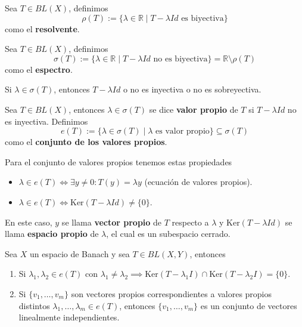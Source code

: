 \documentclass[12pt]{book}
\newcommand{\tbf}{\textbf}
\newcommand{\R}{\mathbb{R}}
\begin{document}
\begin{definicion}[Resolvente]
    Sea $T \in BL(X)$, definimos 
    $$\rho(T) := \{ \lambda \in \mathbb{R} \mid T - \lambda Id \text{ es biyectiva} \}$$
    como el \tbf{resolvente}.
\end{definicion}
\begin{definicion}[Espectro]
    Sea $T \in BL(X)$, definimos 
    $$\sigma(T) := \{ \lambda \in \mathbb{R} \mid T - \lambda Id \text{ no es biyectiva} \}=\R\setminus \rho(T)$$ 
    como el \tbf{espectro}. \\
\end{definicion}

\begin{observacion}
    Si $\lambda \in \sigma(T)$, entonces $T - \lambda Id$ o no es inyectiva o no es sobreyectiva.
\end{observacion}


\begin{definicion}
    Sea $T\in BL(X)$, entonces $\lambda \in \sigma(T)$ se dice \textbf{valor propio} de $T$ si $T - \lambda Id$ no es inyectiva. Definimos 
    $$e(T) := \{ \lambda \in \sigma(T) \mid \lambda \text{ es valor propio} \} \subseteq \sigma(T)$$
    como el \tbf{conjunto de los valores propios}.
\end{definicion}

\begin{observacion}
    Para el conjunto de valores propios tenemos estas propiedades
    \begin{itemize}
        \item $\lambda \in e(T) \iff \exists y \neq 0 : T(y) = \lambda y$ (ecuación de valores propios).
        \item $\lambda \in e(T) \iff \text{Ker}(T - \lambda Id) \neq \{0\}$.
    \end{itemize}
    En este caso, $y$ se llama \textbf{vector propio} de $T$ respecto a $\lambda$ y $\text{Ker}(T - \lambda Id)$ se llama \textbf{espacio propio} de $\lambda$, el cual es un subespacio cerrado.
\end{observacion}


\begin{teo}
    Sea $X$ un espacio de Banach y sea $T \in BL(X, Y)$, entonces
    \begin{enumerate}
        \item Si $\lambda_1, \lambda_2 \in e(T)$ con $\lambda_1 \neq \lambda_2\implies \text{Ker}(T - \lambda_1 I) \cap \text{Ker}(T - \lambda_2 I) = \{0\}$.
        \item Si $\{v_1, \dots, v_m\}$ son vectores propios correspondientes a valores propios distintos \mbox{$\lambda_1, \dots, \lambda_m \in e(T)$}, entonces $\{v_1, \dots, v_m\}$ es un conjunto de vectores linealmente independientes.
    \end{enumerate}
\end{teo}
\end{document}
